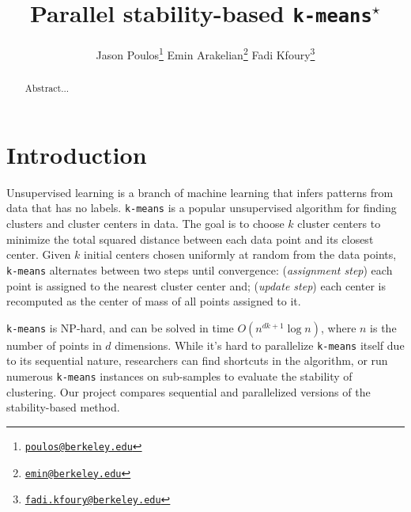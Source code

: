 \documentclass[10pt,twocolumn,letterpaper]{article}
\begin{document}
\title{Parallel stability-based \texttt{k-means}$^\star$}

\author{
    Jason Poulos\thanks{\href{mailto:poulos@berkeley.edu}{\nolinkurl{poulos@berkeley.edu}}}
    \hspace{10mm}
    Emin Arakelian\thanks{\href{mailto:emin@berkeley.edu}{\nolinkurl{emin@berkeley.edu}}}
    \hspace{10mm}
    Fadi Kfoury\thanks{\href{mailto:fadi.kfoury@berkeley.edu}{\nolinkurl{fadi.kfoury@berkeley.edu}}}
    \vspace{15mm}
}

\maketitle

\begin{abstract}
Abstract...
\end{abstract}



\section{Introduction} \label{section:Intro}

Unsupervised learning is a branch of machine learning that infers patterns from data that has no labels. \texttt{k-means} is a popular unsupervised algorithm for finding clusters and cluster centers in data. The goal is to choose $k$ cluster centers to minimize the total squared distance between each data point and its closest center. Given $k$ initial centers chosen uniformly at random from the data points, \texttt{k-means} alternates between two steps until convergence: (\textit{assignment step}) each point is assigned to the nearest cluster center and; (\textit{update step}) each center is recomputed as the center of mass of all points assigned to it.

\texttt{k-means} is NP-hard, and can be solved in time  $O (n^{dk +1} \log n)$, where $n$ is the number of points in $d$ dimensions. While it's hard to parallelize \texttt{k-means} itself due to its sequential nature, researchers can find shortcuts in the algorithm, or run numerous \texttt{k-means} instances on sub-samples to evaluate the stability of clustering. Our project compares sequential and parallelized versions of the stability-based method. 
\end{document}
